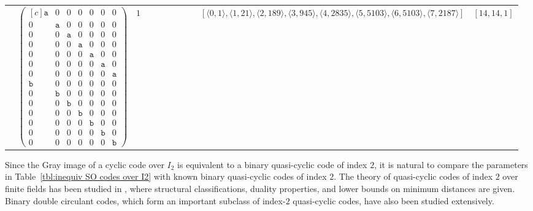 \documentclass[12pt]{article}
\theoremstyle{definition}
\theoremstyle{plain}
\newcommand{\Blue}[1]{{ \color{blue} #1}}
\begin{document}
{\begin{longtable}{@{}cYcccccccZc@{}}
& $\begin{pmatrix*}[c]
\mathtt{a}   &  0    &  0    &   0  &  0  &  0  &  0  \\
0   &  \mathtt{a}    &  0    &   0  &  0  &  0  &  0  \\
0   &  0    &  \mathtt{a}    &   0  &  0  &  0  &  0  \\
0   &  0    &  0    &   \mathtt{a}  &  0  &  0  &  0  \\
0   &  0    &  0    &   0  &  \mathtt{a}  &  0  &  0  \\
0   &  0    &  0    &   0  &  0  &  \mathtt{a}  &  0  \\
0   &  0    &  0    &   0  &  0  &  0  &  \mathtt{a}  \\
\mathtt{b}   &  0    &  0    &   0  &  0  &  0  &  0  \\
0   &  \mathtt{b}    &  0    &   0  &  0  &  0  &  0  \\
0   &  0    &  \mathtt{b}    &   0  &  0  &  0  &  0  \\
0   &  0    &  0    &   \mathtt{b}  &  0  &  0  &  0  \\
0   &  0    &  0    &   0  &  \mathtt{b}  &  0  &  0  \\
0   &  0    &  0    &   0  &  0  &  \mathtt{b}  &  0  \\
0   &  0    &  0    &   0  &  0  &  0  &  \mathtt{b}
\end{pmatrix*}$
& $1$
&
&
&
&
&
&
& $[\langle0,1\rangle,\allowbreak\langle1,21\rangle,\allowbreak\langle2,189\rangle,\allowbreak\langle3,945\rangle,\allowbreak\langle4,2835\rangle,\allowbreak\langle5,5103\rangle,\allowbreak\langle6,5103\rangle,\allowbreak\langle7,2187\rangle]$
& $[14,14,1]$     \\

\end{longtable}
}
\endgroup




Since the Gray image of a cyclic code over $I_2$ is equivalent to a binary
quasi-cyclic code of index $2$, it is natural to compare the parameters in
Table~\ref{tbl:inequiv SO codes over I2} with known binary quasi-cyclic
codes of index $2$. The theory of quasi-cyclic codes of index $2$ over
finite fields has been studied in \cite{AbdukhalikovDzhumadildaevLing_QCcodesIndex2},
where structural classifications, duality properties, and lower bounds on
minimum distances are given. Binary double circulant codes, which form an
important subclass of index-$2$ quasi-cyclic codes, have also been studied
extensively.
\end{document}

